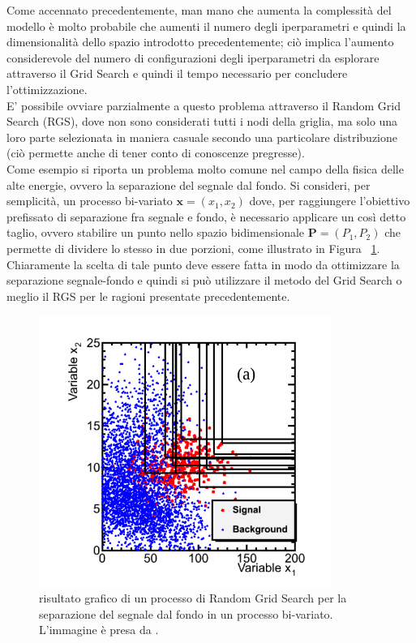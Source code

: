 Come accennato precedentemente, man mano che aumenta la complessità del modello è molto probabile che aumenti il numero degli iperparametri e quindi la dimensionalità dello spazio introdotto precedentemente; ciò implica l'aumento considerevole del numero di configurazioni degli iperparametri da esplorare attraverso il Grid Search e quindi il tempo necessario per concludere l'ottimizzazione.\\
E' possibile ovviare parzialmente a questo problema attraverso il Random Grid Search (RGS), dove non sono considerati tutti i nodi della griglia, ma solo una loro parte selezionata in maniera casuale secondo una particolare distribuzione (ciò permette anche di tener conto di conoscenze pregresse). \\
Come esempio si riporta un problema molto comune nel campo della fisica delle alte energie, ovvero la separazione del segnale dal fondo. Si consideri, per semplicità, un processo bi-variato $\textbf{x} = (x_1,x_2)$ dove, per raggiungere l'obiettivo prefissato di separazione fra segnale e fondo, è necessario applicare un così detto taglio, ovvero stabilire un punto nello spazio bidimensionale $\textbf{P} = (P_1,P_2)$ che permette di dividere lo stesso in due porzioni, come illustrato in Figura ~\ref{fig:grid_example}.\\
Chiaramente la scelta di tale punto deve essere fatta in modo da ottimizzare la separazione segnale-fondo e quindi si può utilizzare il metodo del Grid Search o meglio il RGS per le ragioni presentate precedentemente. 

\begin{figure}[h!]
	\centering
	\includegraphics[width=0.85\textwidth]{figs/Grid_example.png}
	\caption{risultato grafico di un processo di Random Grid Search per la separazione del segnale dal fondo in un processo bi-variato. L'immagine è presa da \cite{Metodi_multivariati}.}
	\label{fig:grid_example}
\end{figure}
\newpage

